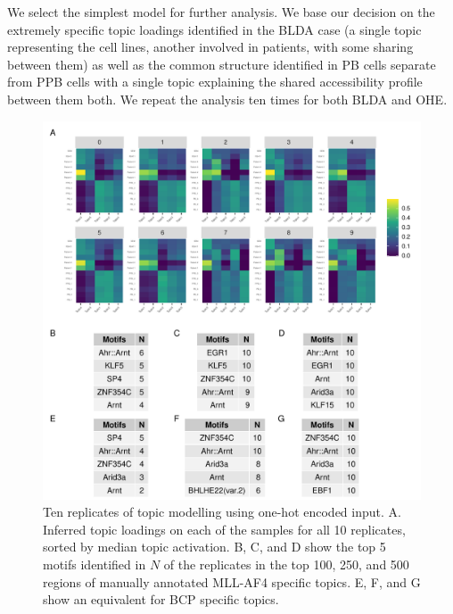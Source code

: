 We select the simplest model for further analysis. We base our decision on the extremely specific topic loadings identified in the BLDA case (a single topic representing the cell lines, another involved in patients, with some sharing between them) as well as the common structure identified in PB cells separate from PPB cells with a single topic explaining the shared accessibility profile between them both. We repeat the analysis ten times for both BLDA and OHE. 

\begin{figure}
    \centering
    \includegraphics[width=\textwidth]{plot/ch5/mll_redo_dummy_reps.pdf}
    \caption{Ten replicates of topic modelling using one-hot encoded input. A. Inferred topic loadings on each of the samples for all 10 replicates, sorted by median topic activation. B, C, and D show the top 5 motifs identified in $N$ of the replicates in the top 100, 250, and 500 regions of manually annotated MLL-AF4 specific topics. E, F, and G show an equivalent for BCP specific topics.}
    \label{fig:mll_redo_topics}
\end{figure}

